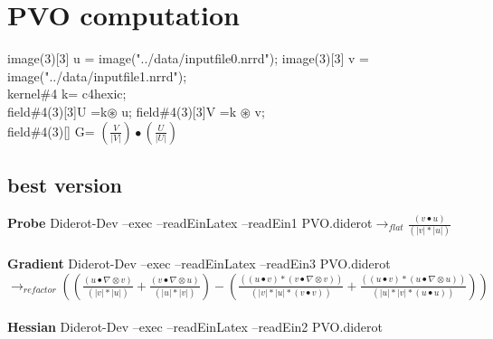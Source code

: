 \documentclass{article}
\begin{document}
\section{PVO computation}
image(3)[3] u = image("../data/inputfile0.nrrd");
image(3)[3] v = image("../data/inputfile1.nrrd");\\
kernel\#4 k= c4hexic;\\
field\#4(3)[3]U =k$\circledast$ u;  field\#4(3)[3]V =k $\circledast$ v;\\
field\#4(3)[] G= $(\frac{V}{|V|})\bullet(\frac{U}{|U|})$\\


\subsection{best version}
\textbf{Probe}
Diderot-Dev --exec --readEinLatex --readEin1 PVO.diderot\newline $\rightarrow_{flat}\frac{(v \bullet u)}{(|v|*|u|)}$\\
\\
\textbf{Gradient}
Diderot-Dev --exec --readEinLatex --readEin3 PVO.diderot
\\\newline $\rightarrow_{refactor}((\frac{(u \bullet  \nabla  \otimes v)}{(|v|*|u|)}+\frac{(v \bullet  \nabla  \otimes u)}{(|u|*|v|)})-(\frac{((u \bullet v)*(v \bullet  \nabla  \otimes v))}{(|v|*|u|*(v \bullet v))}+\frac{((u \bullet v)*(u \bullet  \nabla  \otimes u))}{(|u|*|v|*(u \bullet u))}))$\\
\\
\textbf{Hessian}
Diderot-Dev --exec --readEinLatex  --readEin2 PVO.diderot\\
\end{document}
